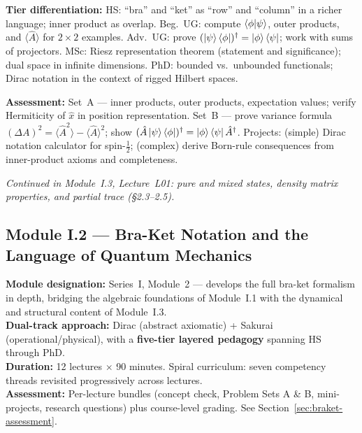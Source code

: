 \documentclass[11pt,a4paper]{article}
\newcommand{\coursebadge}[1]{%
  \begin{tcolorbox}[highlightbox]#1\end{tcolorbox}%
}
\begin{document}
\begin{tcolorbox}[modulebox, title={Module~I.1 / L06: Bra-Ket Formalism (\S2.1--2.2)}]
\medskip\textbf{Tier differentiation:}
HS: ``bra'' and ``ket'' as ``row'' and ``column'' in a richer language; inner product as overlap.
Beg.\ UG: compute $\braket{\phi|\psi}$, outer products, and $\langle\hat{A}\rangle$ for $2\times 2$ examples.
Adv.\ UG: prove $(\ket{\psi}\bra{\phi})^\dagger = \ket{\phi}\bra{\psi}$; work with sums of projectors.
MSc: Riesz representation theorem (statement and significance); dual space in infinite dimensions.
PhD: bounded vs.\ unbounded functionals; Dirac notation in the context of rigged Hilbert spaces.

\medskip\textbf{Assessment:}
Set~A --- inner products, outer products, expectation values; verify Hermiticity of $\hat{x}$ in position representation.
Set~B --- prove variance formula $(\Delta A)^2 = \langle\hat{A}^2\rangle - \langle\hat{A}\rangle^2$;
show $(\hat{A}\ket{\psi}\bra{\phi})^\dagger = \ket{\phi}\bra{\psi}\hat{A}^\dagger$.
Projects: (simple) Dirac notation calculator for spin-$\tfrac{1}{2}$; (complex) derive Born-rule consequences
from inner-product axioms and completeness.
\end{tcolorbox}

\textit{Continued in Module~I.3, Lecture~L01: pure and mixed states,
density matrix properties, and partial trace (\S2.3--2.5).}

\newpage
\subsection{Module I.2 --- Bra-Ket Notation and the Language of Quantum Mechanics}
\label{sec:mod-I2}

\coursebadge{%
  \textbf{Module designation:} Series~I, Module~2 --- develops the full bra-ket
  formalism in depth, bridging the algebraic foundations of Module~I.1 with the
  dynamical and structural content of Module~I.3.\\[2pt]
  \textbf{Dual-track approach:} Dirac (abstract axiomatic) + Sakurai (operational/physical),
  with a \textbf{five-tier layered pedagogy} spanning HS through PhD.\\[2pt]
  \textbf{Duration:} 12 lectures $\times$ 90 minutes. Spiral curriculum: seven competency
  threads revisited progressively across lectures.\\[2pt]
  \textbf{Assessment:} Per-lecture bundles (concept check, Problem Sets A \& B, mini-projects,
  research questions) plus course-level grading. See Section~\ref{sec:braket-assessment}.
}
\end{document}
